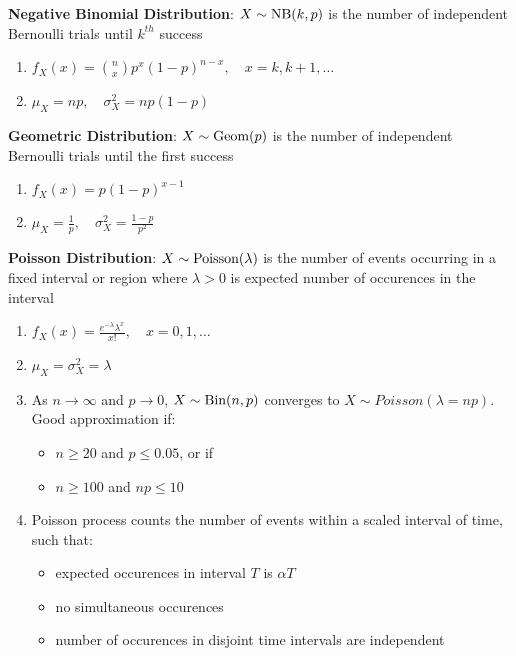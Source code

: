 \documentclass[12pt, a4paper]{article}
\begin{document}
\begin{multicols*}{3}
\textbf{Negative Binomial Distribution}: $X \sim \text{NB}(k, p)$ is the number of independent Bernoulli trials until $k^{th}$ success
\begin{enumerate}[\roman*.]
  \item $f_X(x) = \binom nx p^x(1-p)^{n-x},\quad x=k, k+1,\dots$
  \item $\mu_X = np,\quad\sigma^2_X = np(1-p)$
\end{enumerate}

\textbf{Geometric Distribution}: $X \sim \text{Geom}(p)$ is the number of independent Bernoulli trials until the first success
\begin{enumerate}[\roman*.]
  \item $f_X(x) = p(1 - p)^{x - 1}$
  \item $\mu_X = \frac{1}{p},\quad\sigma^2_X = \frac{1 - p}{p^2}$
\end{enumerate}

\textbf{Poisson Distribution}: $X \sim \text{Poisson}(\lambda)$ is the number of events occurring in a fixed interval or region where $\lambda > 0$ is expected number of occurences in the interval
\begin{enumerate}[\roman*.]
  \item $f_X(x) = \frac{e^{-\lambda} \lambda^x}{x!}, \quad x = 0, 1, \dots$
  \item $\mu_X = \sigma^2_X = \lambda$
  \item As $n\rightarrow \infty$ and $p \rightarrow 0$, $X \sim \text{Bin}(n, p)$ converges to $X \sim Poisson(\lambda = np)$. Good approximation if:
    \begin{itemize}\vspace{1pt }
      \item $n\geq 20$ and $p \leq 0.05$, or if 
      \item $n\geq 100$ and $np \leq 10$
    \end{itemize}
  \item Poisson process counts the number of events within a scaled interval of time, such that:
    \begin{itemize}\vspace{1pt}
      \item expected occurences in interval $T$ is $\alpha T$
      \item no simultaneous occurences
      \item number of occurences in disjoint time intervals are independent 
    \end{itemize}
\end{enumerate}


\end{multicols*}
\end{document}
